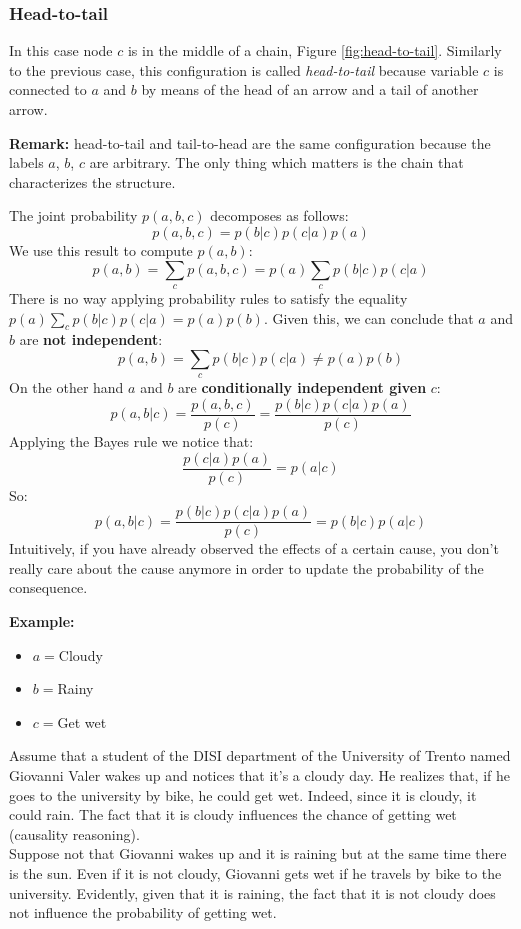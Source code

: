 \subsubsection{Head-to-tail}
In this case node $c$ is in the middle of a chain, Figure \ref{fig:head-to-tail}. Similarly to the previous case, this configuration is called \textit{head-to-tail} because variable $c$ is connected to $a$ and $b$ by means of the head of an arrow and a tail of another arrow. \newline

\textbf{Remark:} head-to-tail and tail-to-head are the same configuration because the labels $a$, $b$, $c$ are arbitrary. The only thing which matters is the chain that characterizes the structure. \newline

The joint probability $p(a,b,c)$ decomposes as follows:
$$p(a,b,c) = p(b|c)p(c|a)p(a)$$
We use this result to compute $p(a,b)$:
$$p(a,b) = \sum_c p(a,b,c) = p(a) \sum_c p(b|c)p(c|a)$$
There is no way applying probability rules to satisfy the equality $p(a) \sum_c p(b|c)p(c|a) = p(a)p(b)$. Given this, we can conclude that $a$ and $b$ are \textbf{not independent}:
$$p(a,b) = \sum_c p(b|c)p(c|a) \neq p(a)p(b)$$
On the other hand $a$ and $b$ are \textbf{conditionally independent given} $c$:
$$p(a,b | c) = \frac{p(a,b,c)}{p(c)} = \frac{p(b|c)p(c|a)p(a)}{p(c)}$$
Applying the Bayes rule we notice that:
$$\frac{p(c|a)p(a)}{p(c)} = p(a|c)$$
So:
$$p(a,b | c) = \frac{p(b|c)p(c|a)p(a)}{p(c)} = p(b|c)p(a|c)$$
Intuitively, if you have already observed the effects of a certain cause, you don't really care about the cause anymore in order to update the probability of the consequence. \newline

\textbf{Example:}
\begin{itemize}
    \item $a=$Cloudy
    \item $b=$Rainy
    \item $c=$Get wet
\end{itemize}
Assume that a student of the DISI department of the University of Trento named Giovanni Valer wakes up and notices that it's a cloudy day. He realizes that, if he goes to the university by bike, he could get wet. Indeed, since it is cloudy, it could rain. The fact that it is cloudy influences the chance of getting wet (causality reasoning).\\
Suppose not that Giovanni wakes up and it is raining but at the same time there is the sun. Even if it is not cloudy, Giovanni gets wet if he travels by bike to the university. Evidently, given that it is raining, the fact that it is not cloudy does not influence the probability of getting wet.

